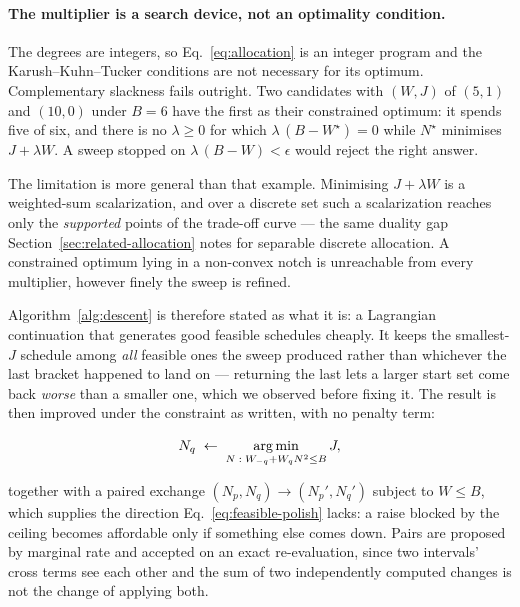 \paragraph{The multiplier is a search device, not an optimality condition.}
The degrees are integers, so Eq.~\eqref{eq:allocation} is an integer program
and the Karush--Kuhn--Tucker conditions are not necessary for its optimum.
Complementary slackness fails outright. Two candidates with $(W,J)$ of $(5,1)$
and $(10,0)$ under $B=6$ have the first as their constrained optimum: it
spends five of six, and there is no $\lambda\ge0$ for which
$\lambda\,(B-W^{\star})=0$ while $N^{\star}$ minimises $J+\lambda W$. A sweep
stopped on $\lambda\,(B-W)<\epsilon$ would reject the right answer.

The limitation is more general than that example. Minimising $J+\lambda W$ is
a weighted-sum scalarization, and over a discrete set such a scalarization
reaches only the \emph{supported} points of the trade-off curve --- the same
duality gap Section~\ref{sec:related-allocation} notes for separable discrete
allocation. A constrained optimum lying in a non-convex notch is unreachable
from every multiplier, however finely the sweep is refined.

Algorithm~\ref{alg:descent} is therefore stated as what it is: a Lagrangian
continuation that generates good feasible schedules cheaply. It keeps the
smallest-$J$ schedule among \emph{all} feasible ones the sweep produced rather
than whichever the last bracket happened to land on --- returning the last
lets a larger start set come back \emph{worse} than a smaller one, which we
observed before fixing it. The result is then improved under the constraint as
written, with no penalty term:

\begin{equation}
  N_q \;\gets\; \operatorname*{arg\,min}_{N\;:\;W_{-q}+W_qN^2\le B} J ,
  \label{eq:feasible-polish}
\end{equation}

together with a paired exchange $(N_p,N_q)\to(N_p',N_q')$ subject to $W\le B$,
which supplies the direction Eq.~\eqref{eq:feasible-polish} lacks: a raise
blocked by the ceiling becomes affordable only if something else comes down.
Pairs are proposed by marginal rate and accepted on an exact re-evaluation,
since two intervals' cross terms see each other and the sum of two
independently computed changes is not the change of applying both.

